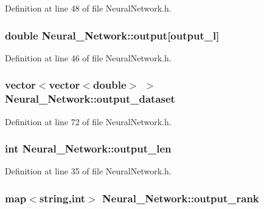Definition at line 48 of file Neural\-Network.\-h.

\hypertarget{a00003_abe5631cce6141b7756154a5a9d247da2}{
\subsubsection[{output}]{\setlength{\rightskip}{0pt plus 5cm}double Neural\-\_\-\-Network\-::output\mbox{[}{\bf output\-\_\-l}\mbox{]}\hspace{0.3cm}{\ttfamily [private]}}}\label{d1/d7c/a00003_abe5631cce6141b7756154a5a9d247da2}


Definition at line 46 of file Neural\-Network.\-h.

\hypertarget{a00003_aa8441449f55f07c3da384d81608373b5}{
\subsubsection[{output\-\_\-dataset}]{\setlength{\rightskip}{0pt plus 5cm}vector$<$vector$<$double$>$ $>$ Neural\-\_\-\-Network\-::output\-\_\-dataset\hspace{0.3cm}{\ttfamily [private]}}}\label{d1/d7c/a00003_aa8441449f55f07c3da384d81608373b5}


Definition at line 72 of file Neural\-Network.\-h.

\hypertarget{a00003_a053d2b510e07b1f25ef112f366bc62ba}{
\subsubsection[{output\-\_\-len}]{\setlength{\rightskip}{0pt plus 5cm}int Neural\-\_\-\-Network\-::output\-\_\-len\hspace{0.3cm}{\ttfamily [private]}}}\label{d1/d7c/a00003_a053d2b510e07b1f25ef112f366bc62ba}


Definition at line 35 of file Neural\-Network.\-h.

\hypertarget{a00003_af46a9de8ef619f93fb8c0231be79163c}{
\subsubsection[{output\-\_\-rank}]{\setlength{\rightskip}{0pt plus 5cm}map$<$string,int$>$ Neural\-\_\-\-Network\-::output\-\_\-rank\hspace{0.3cm}{\ttfamily [private]}}}\label{d1/d7c/a00003_af46a9de8ef619f93fb8c0231be79163c}


